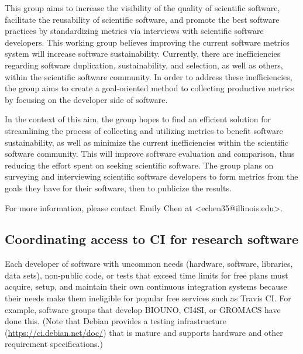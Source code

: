 \documentclass[11pt, oneside]{amsart}
\newcommand{\note}[1]{ {\textcolor{blueish}    { ***Note:      #1 }}}
\begin{document}

This group aims to increase the visibility of the quality of scientific software, facilitate the reusability of scientific software, and promote the best software practices by standardizing metrics via interviews with scientific software developers. This working group believes improving the current software metrics system will increase software sustainability. Currently, there are inefficiencies regarding software duplication, sustainability, and selection, as well as others, within the scientific software community. In order to address these inefficiencies, the group aims to create a goal-oriented method to collecting productive metrics by focusing on the developer side of software.

In the context of this aim, the group hopes to find an efficient solution for streamlining the process of collecting and utilizing metrics to benefit software sustainability, as well as minimize the current inefficiencies within the scientific software community. This will improve software evaluation and comparison, thus reducing the effort spent on seeking scientific software.
%
The group plans on surveying and interviewing scientific software developers to form metrics from the goals they have for their software, then to publicize the results.

For more information, please contact Emily Chen at <echen35@illinois.edu>.



\subsection{Coordinating access to CI for research software}
\label{sec:access}


Each developer of software with uncommon needs (hardware, software, libraries, data sets), non-public code, or tests that exceed time limits for free plans must acquire, setup, and maintain their own continuous integration systems because their needs make them ineligible for popular free services such as Travis CI.  For example, software groups that develop BIOUNO, CI4SI, or GROMACS have done this.
(Note that Debian provides a testing infrastructure (\url{https://ci.debian.net/doc/}) that is mature and supports hardware and other requirement specifications.)
\end{document}
